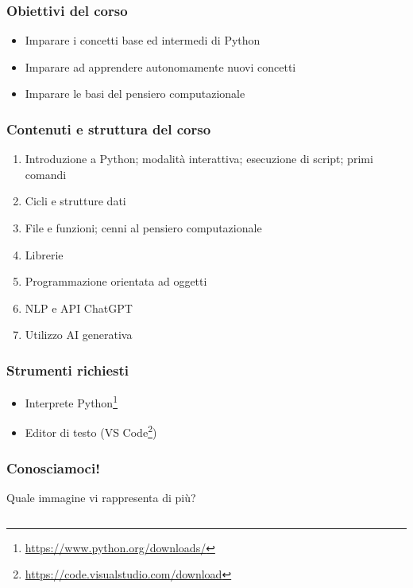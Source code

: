 
\begin{contentframe}
    \frametitle{Obiettivi del corso}

    \begin{itemize}
        \item Imparare i concetti base ed intermedi di Python
        
        \bigskip
        \item Imparare ad apprendere autonomamente nuovi concetti

        \bigskip
        \item Imparare le basi del pensiero computazionale
    \end{itemize}
\end{contentframe}

\begin{contentframe}
    \frametitle{Contenuti e struttura del corso}

    \begin{enumerate}
        \item Introduzione a Python; modalità interattiva; esecuzione di script; primi comandi
        \item Cicli e strutture dati
        \item File e funzioni; cenni al pensiero computazionale
        \item Librerie
        \item Programmazione orientata ad oggetti
        \item NLP e API ChatGPT
        \item Utilizzo AI generativa
    \end{enumerate}
\end{contentframe}

\begin{contentframe}
    \frametitle{Strumenti richiesti}

    \begin{itemize}    
        \item Interprete Python\footnote[frame]{\url{https://www.python.org/downloads/}}
        \item Editor di testo (VS Code\footnote[frame]{\url{https://code.visualstudio.com/download}})
    \end{itemize}
\end{contentframe}

\begin{contentframe}
    \frametitle{Conosciamoci!}
    
    Quale immagine vi rappresenta di più?

    \bigskip
    \begin{columns}
        \centering
        
        \centering
        
        \centering
    \end{columns}
\end{contentframe}

